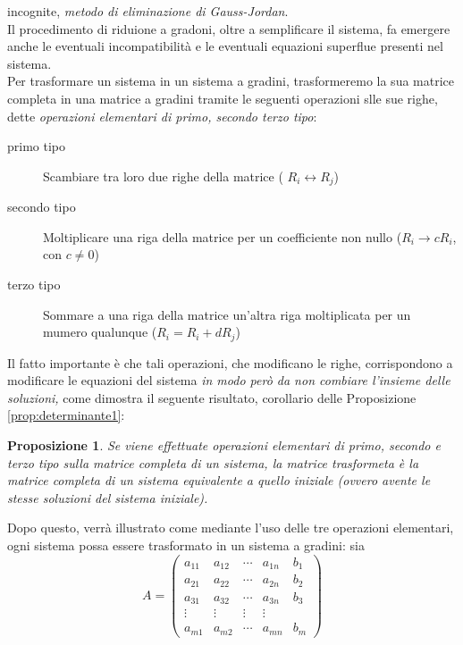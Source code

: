 \documentclass{book}
\theoremstyle{definition}
\theoremstyle{plain}
\newtheorem{prop}{Proposizione}[section]
\begin{document}
incognite, \textit{metodo di eliminazione di Gauss-Jordan}.\\
Il procedimento di riduione a gradoni, oltre a semplificare il sistema, fa
emergere anche le eventuali incompatibilità e le eventuali equazioni
superflue presenti nel sistema.\\
Per trasformare un sistema in un sistema a gradini, trasformeremo la sua
matrice completa in una matrice a gradini tramite le seguenti operazioni
slle sue righe, dette \textit{operazioni elementari di primo, secondo
  terzo tipo}:
\begin{description}
\item[primo tipo] Scambiare tra loro due righe della matrice (
  $R_i \leftrightarrow R_j$)
\item[secondo tipo] Moltiplicare una riga della matrice per un
  coefficiente non nullo ($R_i\to cR_i$, con $c\neq 0$)
\item[terzo tipo] Sommare a una riga della matrice un'altra riga
  moltiplicata per un mumero qualunque ($R_i=R_i+dR_j$)
\end{description}
Il fatto importante è che tali operazioni, che modificano le righe,
corrispondono a modificare le equazioni del sistema \textit{in modo però
  da non combiare l'insieme delle soluzioni,} come dimostra il seguente
risultato, corollario delle Proposizione \ref{prop:determinante1}:
\begin{prop}
  \label{prop:determinante2}
  Se viene effettuate operazioni elementari di primo, secondo e terzo
  tipo sulla matrice completa di un sistema, la matrice trasformeta è la
  matrice completa di un sistema \textit{equivalente} a quello iniziale
  (ovvero avente le stesse soluzioni del sistema iniziale).
\end{prop}
Dopo questo, verrà illustrato come mediante l'uso delle tre operazioni
elementari, ogni sistema possa essere trasformato in un sistema a gradini:
sia
\begin{equation}
  \label{eq:gauss-jorda4}
  A=
  \begin{pmatrix}
    a_{11} & a_{12} & \cdots & a_{1n} & b_1\\
    a_{21} & a_{22} & \cdots & a_{2n} & b_2\\
    a_{31} & a_{32} & \cdots & a_{3n} & b_3\\
    \vdots & \vdots & \vdots & \vdots\\
    a_{m1} & a_{m2} & \cdots & a_{mn} & b_m
  \end{pmatrix}
\end{equation}
\end{document}
